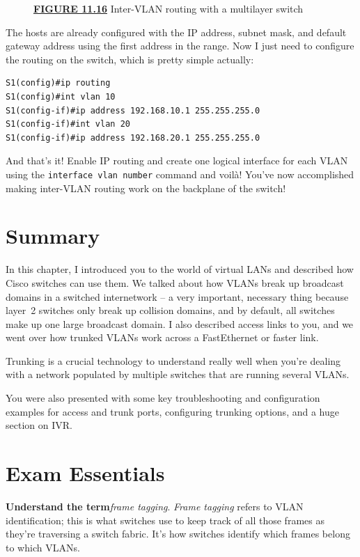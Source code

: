 \begin{figure}
\centering
\caption{{\protect\hyperlink{c11.xhtmlux5cux23figureanchor11-16}{\textbf{FIGURE
11.16}} Inter-VLAN routing with a multilayer switch}}
\end{figure}

The hosts are already configured with the IP address, subnet mask, and
default gateway address using the first address in the range. Now I just
need to configure the routing on the switch, which is pretty simple
actually:

\begin{verbatim}
S1(config)#ip routing
S1(config)#int vlan 10
S1(config-if)#ip address 192.168.10.1 255.255.255.0
S1(config-if)#int vlan 20
S1(config-if)#ip address 192.168.20.1 255.255.255.0
\end{verbatim}

And that's it! Enable IP routing and create one logical interface for
each VLAN using the \texttt{interface\ vlan\ number} command and voilà!
You've now accomplished making inter-VLAN routing work on the backplane
of the switch!

\section{Summary}

In this chapter, I introduced you to the world of virtual LANs and
described how Cisco switches can use them. We talked about how VLANs
break up broadcast domains in a switched internetwork -- a very
important, necessary thing because layer~2 switches only break up
collision domains, and by default, all switches make up one large
broadcast domain. I also described access links to you, and we went over
how trunked VLANs work across a FastEthernet or faster link.

Trunking is a crucial technology to understand really well when you're
dealing with a network populated by multiple switches that are running
several VLANs.

You were also presented with some key troubleshooting and configuration
examples for access and trunk ports, configuring trunking options, and a
huge section on IVR.

\section{Exam Essentials}

\textbf{Understand the term}\emph{frame tagging}. \emph{Frame tagging}
refers to VLAN identification; this is what switches use to keep track
of all those frames as they're traversing a switch fabric. It's how
switches identify which frames belong to which VLANs.


